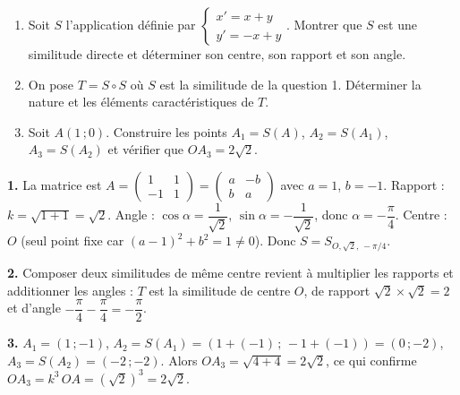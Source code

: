 \documentclass[11pt]{article}
\begin{document}
\begin{exercice}
\begin{enumerate}
\item Soit $S$ l'application définie par $\begin{cases} x' = x + y \\ y' = -x + y \end{cases}$. Montrer que $S$ est une similitude directe et déterminer son centre, son rapport et son angle.
\item On pose $T = S \circ S$ où $S$ est la similitude de la question 1. Déterminer la nature et les éléments caractéristiques de $T$.
\item Soit $A(1\,;0)$. Construire les points $A_1 = S(A)$, $A_2 = S(A_1)$, $A_3 = S(A_2)$ et vérifier que $OA_3 = 2\sqrt{2}$.
\end{enumerate}
\end{exercice}

\begin{corrige}[Exercice]
\textbf{1.} La matrice est $A = \begin{pmatrix} 1 & 1 \\ -1 & 1 \end{pmatrix} = \begin{pmatrix} a & -b \\ b & a \end{pmatrix}$ avec $a = 1$, $b = -1$. Rapport : $k = \sqrt{1+1} = \sqrt{2}$. Angle : $\cos\alpha = \dfrac{1}{\sqrt{2}}$, $\sin\alpha = -\dfrac{1}{\sqrt{2}}$, donc $\alpha = -\dfrac{\pi}{4}$. Centre : $O$ (seul point fixe car $(a-1)^2 + b^2 = 1 \neq 0$). Donc $S = S_{O,\sqrt{2},\,-\pi/4}$.

\textbf{2.} Composer deux similitudes de même centre revient à multiplier les rapports et additionner les angles : $T$ est la similitude de centre $O$, de rapport $\sqrt{2}\times\sqrt{2} = 2$ et d'angle $-\dfrac{\pi}{4}-\dfrac{\pi}{4} = -\dfrac{\pi}{2}$.

\textbf{3.} $A_1 = (1\,;-1)$, $A_2 = S(A_1) = (1+(-1)\,;\,-1+(-1)) = (0\,;-2)$, $A_3 = S(A_2) = (-2\,;-2)$. Alors $OA_3 = \sqrt{4+4} = 2\sqrt{2}$, ce qui confirme $OA_3 = k^3\,OA = (\sqrt{2})^3 = 2\sqrt{2}$.
\end{corrige}
\end{document}
